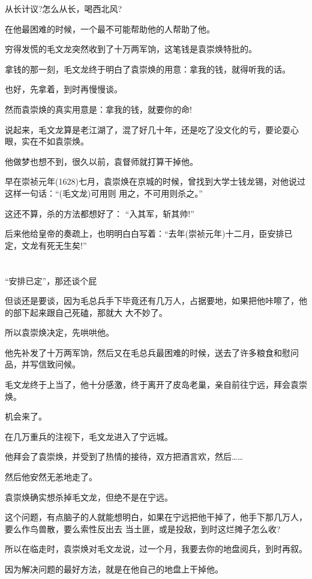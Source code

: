 \documentclass[11pt,a4paper,onecolumn]{article}
\begin{document}
从长计议?怎么从长，喝西北风?

在他最困难的时候，一个最不可能帮助他的人帮助了他。

穷得发慌的毛文龙突然收到了十万两军饷，这笔钱是袁崇焕特批的。

拿钱的那一刻，毛文龙终于明白了袁崇焕的用意：拿我的钱，就得听我的话。

也好，先拿着，到时再慢慢谈。

然而袁崇焕的真实用意是：拿我的钱，就要你的命!

说起来，毛文龙算是老江湖了，混了好几十年，还是吃了没文化的亏，要论耍心眼，实在不如袁崇焕。

他做梦也想不到，很久以前，袁督师就打算干掉他。

早在崇祯元年(1628)七月，袁崇焕在京城的时候，曾找到大学士钱龙锡，对他说过这样一句话：``(毛文龙)可用则
用之，不可用则杀之。''

这还不算，杀的方法都想好了： ``入其军，斩其帅!''

后来他给皇帝的奏疏上，也明明白白写着：``去年(崇祯元年)十二月，臣安排已定，文龙有死无生矣!''

\section[\thesection]{}

``安排已定''，那还谈个屁

但谈还是要谈，因为毛总兵手下毕竟还有几万人，占据要地，如果把他咔嚓了，他的部下起来跟自己死磕，那就大
大不妙了。

所以袁崇焕决定，先哄哄他。

他先补发了十万两军饷，然后又在毛总兵最困难的时候，送去了许多粮食和慰问品，并写信致问候。

毛文龙终于上当了，他十分感激，终于离开了皮岛老巢，亲自前往宁远，拜会袁崇焕。

机会来了。

在几万重兵的注视下，毛文龙进入了宁远城。

他拜会了袁崇焕，并受到了热情的接待，双方把酒言欢，然后……

然后他安然无恙地走了。

袁崇焕确实想杀掉毛文龙，但绝不是在宁远。

这个问题，有点脑子的人就能想明白，如果在宁远把他干掉了，他手下那几万人，要么作鸟兽散，要么索性反出去
当土匪，或是投敌，到时这烂摊子怎么收?

所以在临走时，袁崇焕对毛文龙说，过一个月，我要去你的地盘阅兵，到时再叙。

因为解决问题的最好方法，就是在他自己的地盘上干掉他。
\end{document}
